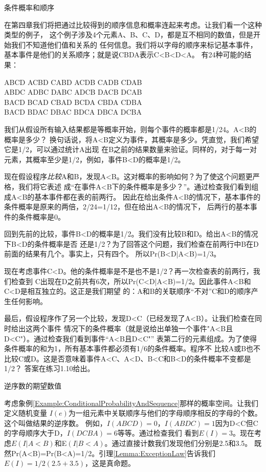 \begin{example}\label{Example:ConditionalProbabilityAndSequence}
条件概率和顺序

在第四章我们将把通过比较得到的顺序信息和概率连起来考虑。让我们看一个这种类型的例子，
这个例子涉及4个元素A、B、C、D，都是互不相同的数值，但是开始我们不知道他们值和关系的
任何信息。我们将以字母的顺序来标记基本事件，基本事件是他们的关系顺序；就是说CBDA表示C<B<D<A。
有24种可能的结果：

ABCD   ACBD   CABD   ACDB   CADB   CDAB\\
\indent ABDC   ADBC   DABC   ADCB   DACB   DCAB\\
\indent BACD   BCAD   CBAD   BCDA   CBDA   CDBA\\
\indent BACD   BDAC   DBAC   BDCA   DBCA   DCBA

我们从假设所有输入结果都是等概率开始，则每个事件的概率都是1/24。A<B的概率是多少？
换句话说，将A<B定义为事件，其概率是多少。凭直觉，我们希望它是1/2，可以通过统计A出现
在B之前的结果数量来验证。同样的，对于每一对元素，其概率至少是1/2，例如，事件B<D的概率是1/2。

现在假设程序\emph{比较}A和B，发现A<B。这对概率的影响如何？为了使这个问题更严格，我们将它表述
成“在事件A<B下的条件概率是多少？”。通过检查我们看到组成A<B的基本事件都在表的前两行。
因此在给出条件A<B的情况下，基本事件的条件概率是原来的两倍，2/24=1/12，但在给出A<B的情况下，
后两行的基本事件的条件概率是0。

回到先前的比较，事件B<D的概率是1/2。我们没有比较B和D。给出A<B的情况下B<D的条件概率是否
还是1/2？为了回答这个问题，我们检查在前两行中B在D前面的结果有几个。事实上，只有四个。
所以Pr(B<D|A<B)=1/3。

现在考虑事件C<D。他的条件概率是不是也不是1/2？再一次检查表的前两行，我们检查到
C出现在D之前共有6次，所以Pr(C<D|A<B)=1/2。因此事件A<B和C<D是相互独立的。这正是我们期望
的：A和B的关联顺序“不对”C和D的顺序产生任何影响。

最后，假设程序作了另一个比较，发现D<C（已经发现了A<B）。让我们检查在同时给出这两个事件
情况下的条件概率（就是说给出单独一个事件"A<B且D<C"）。通过检查我们看到事件“A<B且D<C"”
表第二行的元素组成。为了使得条件概率的和为1，所有基本事件都必须有1/6的条件概率。程序不
比较A或B也不比较C或D。这是否意味着事件A<C、A<D、B<C和B<D的条件概率不变都是1/2？
答案在练习1.10给出。

\end{example}

\begin{example}
逆序数的期望数值

考虑象例\ref{Example:ConditionalProbabilityAndSequence}那样的概率空间。让我们定义随机变量
$I(e)$为一组元素中关联顺序与他们的字母顺序相反的字母的个数。这个叫做结果的逆序数。
例如，$I(ABCD)=0$，$I(ABDC)=1$因为D<C但C的字母顺序大于D，$I(DCBA)=6$等等。通过检查我们
看到$E(I)=3$。现在考虑$E(I|A<B)$和E$(I|B<A)$。通过直接计数我们发现他们分别是2.5和3.5。
既然Pr(A<B)=Pr(B<A)=1/2。引理\ref{Lemma:ExceptionLaw}告诉我们$E(I)=1/2(2.5+3.5)$，这是真命题。
\end{example}

